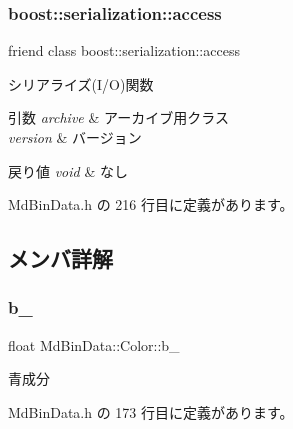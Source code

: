 \subsubsection{\texorpdfstring{boost\+::serialization\+::access}{boost::serialization::access}}
{\footnotesize\ttfamily friend class boost\+::serialization\+::access\hspace{0.3cm}{\ttfamily [friend]}}



シリアライズ(I/O)関数 


\begin{DoxyParams}{引数}
{\em archive} & アーカイブ用クラス \\
\hline
{\em version} & バージョン \\
\hline
\end{DoxyParams}

\begin{DoxyRetVals}{戻り値}
{\em void} & なし \\
\hline
\end{DoxyRetVals}


 Md\+Bin\+Data.\+h の 216 行目に定義があります。



\subsection{メンバ詳解}
\mbox{\label{class_md_bin_data_1_1_color_a082688900f611ea48822a5b4ccd74afc}} 
\subsubsection{\texorpdfstring{b\+\_\+}{b\_}}
{\footnotesize\ttfamily float Md\+Bin\+Data\+::\+Color\+::b\+\_\+\hspace{0.3cm}{\ttfamily [private]}}



青成分 



 Md\+Bin\+Data.\+h の 173 行目に定義があります。

\mbox{\label{class_md_bin_data_1_1_color_a5bdd552987125758d30cbe395909b118}} 
